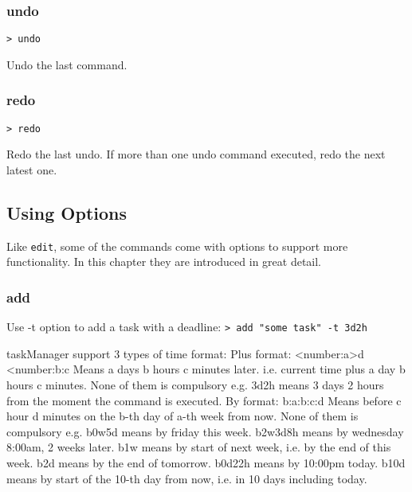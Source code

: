 \documentclass[12pt, a4paper]{article}
\begin{document}

\subsubsection{undo}
\texttt{\textgreater \ undo \footnotemark}

Undo the last command. 


\subsubsection{redo}
\texttt{\textgreater \ redo}

Redo the last undo. If more than one undo command executed, redo the next latest one.

\subsection{Using Options}

Like \texttt{edit}, some of the commands come with options to support more functionality.
In this chapter they are introduced in great detail.

\subsubsection{add}

Use -t option to add a task with a deadline:
\texttt{\textgreater \ add "some task" -t 3d2h\\}

    taskManager support 3 types of time format: 
    Plus format:        \textless number:a\textgreater d \textless number:b\textgreaterh\textlessnumber:c\textgreaterm
                        Means a days b hours c minutes later. i.e. current time plus a day b hours c minutes.
                        None of them is compulsory
                        e.g. 3d2h means 3 days 2 hours from the moment the command is executed.
    By format:          b\textlessnumber:a\textgreaterw\textlessnumber:b\textgreaterd\textlessnumber:c\textgreaterh\textlessnumber:d\textgreaterm
                        Means before c hour d minutes on the b-th day of a-th week from now.
                        None of them is compulsory
                        e.g. b0w5d means by friday this week.
                             b2w3d8h means by wednesday 8:00am, 2 weeks later.
                             b1w means by start of next week, i.e. by the end of this week.
                             b2d means by the end of tomorrow.
                             b0d22h means by 10:00pm today.
                             b10d means by start of the 10-th day from now, i.e. in 10 days including today.
\end{document}
